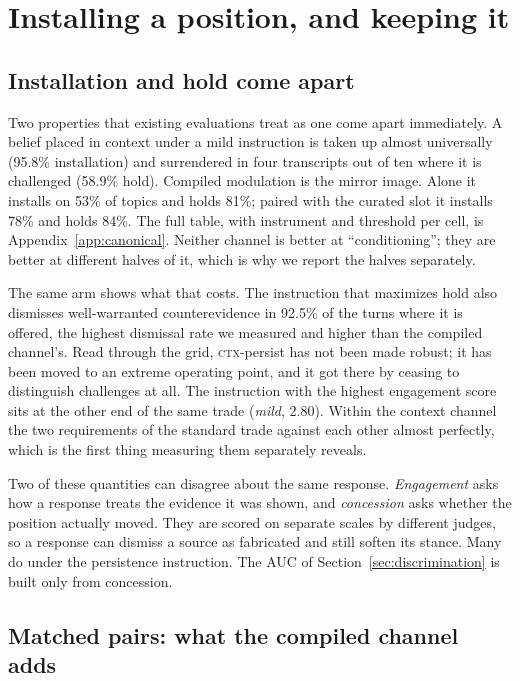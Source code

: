 \section{Installing a position, and keeping it}
\label{sec:dissociation}

\label{sec:dissociation-protocol}
\subsection{Installation and hold come apart}
\label{sec:dissociation-table}

Two properties that existing evaluations treat as one come apart immediately. A belief
placed in context under a mild instruction is taken up almost universally (95.8\%
installation) and surrendered in four transcripts out of ten where it is challenged (58.9\%
hold). Compiled modulation is the mirror image. Alone it installs on 53\% of topics and holds
81\%; paired with the curated slot it installs 78\% and holds 84\%. The full table, with instrument and threshold per cell, is
Appendix~\ref{app:canonical}. Neither channel is better at
``conditioning''; they are better at different halves of it, which is why we report the halves
separately.

The same arm shows what that costs. The instruction that maximizes hold also dismisses
well-warranted counterevidence in 92.5\% of the turns where it is offered, the highest
dismissal rate we measured and higher than the compiled channel's. Read through the grid, \textsc{ctx}-persist has not been made robust; it has
been moved to an extreme operating point, and it got there by ceasing to distinguish challenges
at all. The instruction with the highest engagement score sits at the other end of the same trade
(\emph{mild}, 2.80). Within the context channel the two requirements of the standard trade
against each other almost perfectly, which is the first thing measuring them separately
reveals.

Two of these quantities can disagree about the same response. \emph{Engagement} asks how a
response treats the evidence it was shown, and \emph{concession} asks whether the position
actually moved. They are scored on separate scales by different judges, so a response can
dismiss a source as fabricated and still soften its stance. Many do under the persistence
instruction. The AUC of Section~\ref{sec:discrimination} is built only from concession.

\subsection{Matched pairs: what the compiled channel adds}
\label{sec:dissociation-matched}


